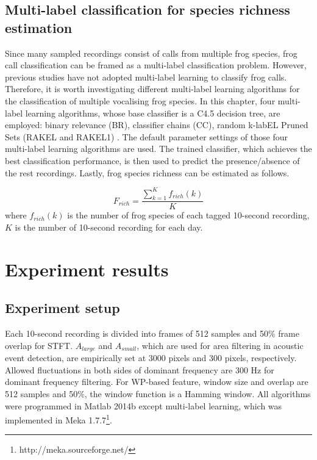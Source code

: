 \subsection{Multi-label classification for species richness estimation} 
Since many sampled recordings consist of calls from multiple frog species, frog call classification can be framed as a multi-label classification problem. However, previous studies have not adopted multi-label learning to classify frog calls. Therefore, it is worth investigating different multi-label learning algorithms for the classification of multiple vocalising frog species. In this chapter, four multi-label learning algorithms, whose base classifier is a C4.5 decision tree, are employed: binary relevance (BR), classifier chains (CC), random k-labEL Pruned Sets (RAKEL and RAKEL1) \citep{ZhangReview2014}. The default parameter settings of those four multi-label learning algorithms are used. The trained classifier, which achieves the best classification performance, is then used to predict the presence/absence of the rest recordings. Lastly, frog species richness can be estimated as follows.

\begin{equation}
F_{rich} = \frac{\sum_{k=1}^{K}f_{rich}(k)}{K}
\end{equation} 
where $f_{rich}(k)$ is the number of frog species of each tagged 10-second recording, $K$ is the number of 10-second recording for each day.




\section{Experiment results}



\subsection{Experiment setup}
Each 10-second recording is divided into frames of 512 samples and 50\% frame overlap for STFT. $A_{large}$ and $A_{small}$, which are used for area filtering in acoustic event detection, are empirically set at 3000 pixels and 300 pixels, respectively. Allowed fluctuations in both sides of dominant frequency are 300 Hz for dominant frequency filtering. For WP-based feature, window size and overlap are 512 samples and 50\%, the window function is a Hamming window. All algorithms were programmed in Matlab 2014b except multi-label learning, which was implemented in Meka 1.7.7\footnote[4]{http://meka.sourceforge.net/}. 




